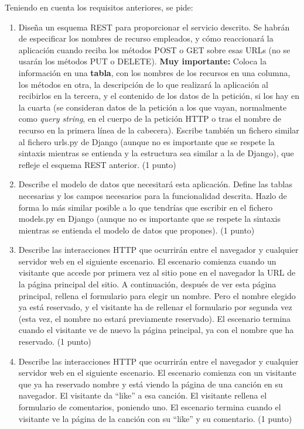 Teniendo en cuenta los requisitos anteriores, se pide:

\begin{enumerate}
\item Diseña un esquema REST para proporcionar el servicio descrito. Se habrán de especificar los nombres de recurso empleados, y cómo reaccionará la aplicación cuando reciba los métodos POST o GET sobre esas URLs (no se usarán los métodos PUT o DELETE). \textbf{Muy importante:} Coloca la información en una \textbf{tabla}, con los nombres de los recursos en una columna, los métodos en otra, la descripción de lo que realizará la aplicación al recibirlos en la tercera, y el contenido de los datos de la petición, si los hay en la cuarta (se consideran datos de la petición a los que vayan, normalmente como \emph{query string}, en el cuerpo de la petición HTTP o tras el nombre de recurso en la primera línea de la cabecera). Escribe también un fichero similar al fichero urls.py de Django (aunque no es importante que se respete la sintaxis mientras se entienda y la estructura sea similar a la de Django), que refleje el esquema REST anterior. (1 punto)

\item Describe el modelo de datos que necesitará esta aplicación. Define las tablas necesarias y los campos necesarios para la funcionalidad descrita. Hazlo de forma lo más similar posible a lo que tendrías que escribir en el fichero models.py en Django (aunque no es importante que se respete la sintaxis mientras se entienda el modelo de datos que propones). (1 punto)

\item Describe las interacciones HTTP que ocurrirán entre el navegador y cualquier servidor web en el siguiente escenario. El escenario comienza cuando un visitante que accede por primera vez al sitio pone en el navegador la URL de la página principal del sitio. A continuación, después de ver esta página principal, rellena el formulario para elegir un nombre. Pero el nombre elegido ya está reservado, y el visitante ha de rellenar el formulario por segunda vez (esta vez, el nombre no estará previamente reservado). El escenario termina cuando el visitante ve de nuevo la página principal, ya con el nombre que ha reservado. (1 punto)

\item Describe las interacciones HTTP que ocurrirán entre el navegador y cualquier servidor web en el siguiente escenario. El escenario comienza con un visitante que ya ha reservado nombre y está viendo la página de una canción en su navegador. El visitante da ``like'' a esa canción. El visitante rellena el formulario de comentarios, poniendo uno. El escenario termina cuando el visitante ve la página de la canción con su ``like'' y su comentario. (1 punto)


\end{enumerate}
